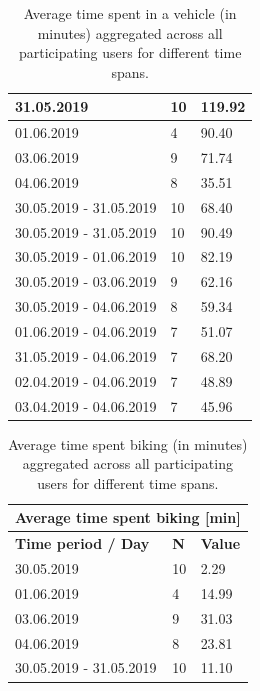 \begin{table}[]
{\begin{tabular}{|l|l|l|}
			31.05.2019                 & 10         & 119.92                   \\ \hline
			01.06.2019                 & 4          & 90.40                    \\ \hline
			03.06.2019                 & 9          & 71.74                    \\ \hline
			04.06.2019                 & 8          & 35.51                    \\ \hline
			30.05.2019 - 31.05.2019    & 10         & 68.40                    \\ \hline
			30.05.2019 - 31.05.2019    & 10         & 90.49                    \\ \hline
			30.05.2019 - 01.06.2019    & 10         & 82.19                    \\ \hline
			30.05.2019 - 03.06.2019    & 9          & 62.16                    \\ \hline
			30.05.2019 - 04.06.2019    & 8          & 59.34                    \\ \hline
			01.06.2019 - 04.06.2019    & 7          & 51.07                    \\ \hline
			31.05.2019 - 04.06.2019    & 7          & 68.20                    \\ \hline
			02.04.2019 - 04.06.2019    & 7          & 48.89                    \\ \hline
			03.04.2019 - 04.06.2019    & 7          & 45.96                    \\ \hline
		\end{tabular}
		\caption{Average time spent in a vehicle (in minutes) aggregated across all participating users for different time spans.}

		\label{results-vehicle}
	}
\end{table}

\begin{table}[]
	\centering
	\begin{tabular}{|l|l|l|}
		\hline
		\multicolumn{3}{|c|}{\textbf{Average time spent biking {[}min{]}}}           \\ \hline
		\textbf{Time period / Day} & \textbf{N} & \textbf{Value} \\ \hline
		30.05.2019                 & 10         & 2.29                     \\ \hline
		01.06.2019                 & 4          & 14.99                    \\ \hline
		03.06.2019                 & 9          & 31.03                    \\ \hline
		04.06.2019                 & 8          & 23.81                    \\ \hline
		30.05.2019 - 31.05.2019    & 10         & 11.10                    \\ \hline
	\end{tabular}
		\caption{Average time spent biking (in minutes) aggregated across all participating users for different time spans.}
	\label{results-biking}
\end{table}

